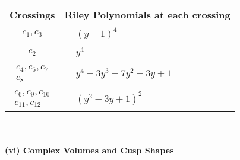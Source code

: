 \documentclass[1p]{elsarticle_modified}
\theoremstyle{definition}
\begin{document}
\begin{tabular}{m{50pt}|m{274pt}}
Crossings & \hspace{64pt}Riley Polynomials at each crossing \\
\hline $$\begin{aligned}c_{1},c_{3}\end{aligned}$$&$\begin{aligned}
&(y-1)^4
\end{aligned}$\\
\hline $$\begin{aligned}c_{2}\end{aligned}$$&$\begin{aligned}
&y^4
\end{aligned}$\\
\hline $$\begin{aligned}c_{4},c_{5},c_{7}\\c_{8}\end{aligned}$$&$\begin{aligned}
&y^4-3 y^3-7 y^2-3 y+1
\end{aligned}$\\
\hline $$\begin{aligned}c_{6},c_{9},c_{10}\\c_{11},c_{12}\end{aligned}$$&$\begin{aligned}
&(y^2-3 y+1)^2
\end{aligned}$\\
\hline
\end{tabular}\\~\\
\newpage\flushleft \textbf{(vi) Complex Volumes and Cusp Shapes}
\end{document}
